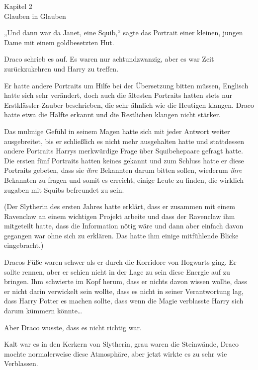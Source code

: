 

\hypertarget{glauben-in-glauben}{%

Kapitel 2\\ Glauben in Glauben

„Und dann war da Janet, eine Squib,“ sagte das Portrait einer kleinen, jungen Dame mit einem goldbesetzten Hut.

Draco schrieb es auf. Es waren nur achtundzwanzig, aber es war Zeit zurückzukehren und Harry zu treffen.

Er hatte andere Portraits um Hilfe bei der Übersetzung bitten müssen, Englisch hatte sich sehr verändert, doch auch die ältesten Portraits hatten stets nur Erstklässler-Zauber beschrieben, die sehr ähnlich wie die Heutigen klangen. Draco hatte etwa die Hälfte erkannt und die Restlichen klangen nicht stärker.

Das mulmige Gefühl in seinem Magen hatte sich mit jeder Antwort weiter ausgebreitet, bis er schließlich es nicht mehr ausgehalten hatte und stattdessen andere Portraits Harrys merkwürdige Frage über Squibehepaare gefragt hatte. Die ersten fünf Portraits hatten keines gekannt und zum Schluss hatte er diese Portraits gebeten, dass sie \emph{ihre} Bekannten darum bitten sollen, wiederum \emph{ihre} Bekannten zu fragen und somit es erreicht, einige Leute zu finden, die wirklich zugaben mit Squibs befreundet zu sein.

(Der Slytherin des ersten Jahres hatte erklärt, dass er zusammen mit einem Ravenclaw an einem wichtigen Projekt arbeite und dass der Ravenclaw ihm mitgeteilt hatte, dass die Information nötig wäre und dann aber einfach davon gegangen war ohne sich zu erklären. Das hatte ihm einige mitfühlende Blicke eingebracht.)

Dracos Füße waren schwer als er durch die Korridore von Hogwarts ging. Er sollte rennen, aber er schien nicht in der Lage zu sein diese Energie auf zu bringen. Ihm schwierte im Kopf herum, dass er nichts davon wissen wollte, dass er nicht darin verwickelt sein wollte, dass es nicht in seiner Verantwortung lag, dass Harry Potter es machen sollte, dass wenn die Magie verblasste Harry sich darum kümmern könnte…

Aber Draco wusste, dass es nicht richtig war.

Kalt war es in den Kerkern von Slytherin, grau waren die Steinwände, Draco mochte normalerweise diese Atmosphäre, aber jetzt wirkte es zu sehr wie Verblassen.

}

